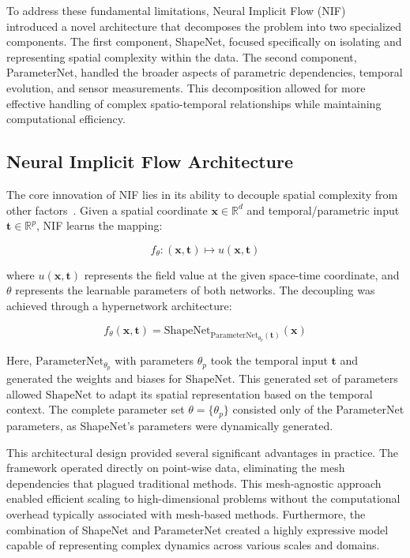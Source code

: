 \documentclass[10pt,journal,compsoc,onecolumn]{IEEEtran}
\begin{document}
To address these fundamental limitations, Neural Implicit Flow (NIF)~\cite{nif2023} introduced a novel architecture that decomposes the problem into two specialized components. The first component, ShapeNet, focused specifically on isolating and representing spatial complexity within the data. The second component, ParameterNet, handled the broader aspects of parametric dependencies, temporal evolution, and sensor measurements. This decomposition allowed for more effective handling of complex spatio-temporal relationships while maintaining computational efficiency.

\subsection{Neural Implicit Flow Architecture}
The core innovation of NIF lies in its ability to decouple spatial complexity from other factors~\cite{nif2023}. Given a spatial coordinate $\mathbf{x} \in \mathbb{R}^d$ and temporal/parametric input $\mathbf{t} \in \mathbb{R}^p$, NIF learns the mapping:

\begin{equation}
    f_\theta: (\mathbf{x}, \mathbf{t}) \mapsto u(\mathbf{x}, \mathbf{t})
\end{equation}

where $u(\mathbf{x}, \mathbf{t})$ represents the field value at the given space-time coordinate, and $\theta$ represents the learnable parameters of both networks. The decoupling was achieved through a hypernetwork architecture:

\begin{equation}
    f_\theta(\mathbf{x}, \mathbf{t}) = \text{ShapeNet}_{\text{ParameterNet}_{\theta_p}(\mathbf{t})}(\mathbf{x})
\end{equation}

Here, $\text{ParameterNet}_{\theta_p}$ with parameters $\theta_p$ took the temporal input $\mathbf{t}$ and generated the weights and biases for $\text{ShapeNet}$. This generated set of parameters allowed $\text{ShapeNet}$ to adapt its spatial representation based on the temporal context. The complete parameter set $\theta = \{\theta_p\}$ consisted only of the ParameterNet parameters, as ShapeNet's parameters were dynamically generated.

This architectural design provided several significant advantages in practice. The framework operated directly on point-wise data, eliminating the mesh dependencies that plagued traditional methods. This mesh-agnostic approach enabled efficient scaling to high-dimensional problems without the computational overhead typically associated with mesh-based methods. Furthermore, the combination of ShapeNet and ParameterNet created a highly expressive model capable of representing complex dynamics across various scales and domains.
\end{document}
